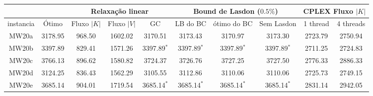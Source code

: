 \documentclass[12pt]{article}
\begin{document}
\begin{sidewaystable}[h]
\centering
\begin{tabular}{|c|c|c|c|c|c|c|c|c|c|}
\cline{3-10}
\multicolumn{2}{c}{} & \multicolumn{3}{|c}{Relaxa\c{c}\~ao linear} & \multicolumn{3}{|c|}{Bound de Lasdon ($0.5\%$)} & \multicolumn{2}{c|}{CPLEX Fluxo $|K|$} \\
\hline
instancia & \'Otimo & Fluxo $|K|$ & Fluxo $|V|$ & GC & LB do BC & \'otimo do BC & Sem Lasdon & 1 thread & 4 threads \\
\hline
MW20a & 3178.95 & 968.50 & 1602.02 & 3170.51 & 3173.43 & 3170.97 & 3173.30 & 2723.79 &  2750.94 \\ 
MW20b & 3397.89 & 829.41 & 1571.26 & 3397.89$^*$ & 3397.89$^*$ & 3397.89$^*$ & 3397.89$^*$ & 2711.25 & 2724.83\\
MW20c & 3766.13 & 896.62 & 1580.82 & 3724.37 & 3726.76 & 3727.25 & 3727.50 & 2776.33 & 2886.33 \\
MW20d & 3124.25 & 836.43 & 1562.29 & 3105.55 & 3112.86 & 3110.06 & 3110.06 & 2725.73 & 2749.15 \\
MW20e & 3685.14 & 904.01 & 1719.54 & 3685.14$^*$ & 3685.14$^*$ & 3685.14$^*$ & 3685.14$^*$ & 2831.14 & 2942.05 \\
\hline
\end{tabular}
\end{sidewaystable}
\end{document}

